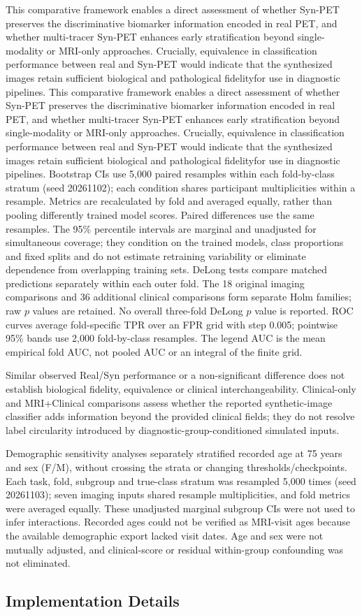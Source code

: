 \documentclass{article}
\providecommand{\DIFaddtex}[1]{{\protect\color{blue} \sf #1}} %
\providecommand{\DIFdeltex}[1]{{\protect\color{red} \ifmmode #1\else\scriptsize #1\fi}} %
\providecommand{\DIFaddbegin}{} %
\providecommand{\DIFaddend}{} %
\providecommand{\DIFdelbegin}{} %
\providecommand{\DIFdelend}{} %
\providecommand{\DIFadd}[1]{\texorpdfstring{\DIFaddtex{#1}}{#1}} %
\providecommand{\DIFdel}[1]{\texorpdfstring{\DIFdeltex{#1}}{}} %
\newcommand{\DIFscaledelfig}{0.5}
\newlength{\DIFdelgraphicswidth} %
\newlength{\DIFdelgraphicsheight} %
\newcommand{\DIFaddincludegraphics}[2][]{{\color{blue}\fbox{\DIFOincludegraphics[#1]{#2}}}} %
\newcommand{\DIFdelincludegraphics}[2][]{%
\sbox{\DIFdelgraphicsbox}{\DIFOincludegraphics[#1]{#2}}%
\settoboxwidth{\DIFdelgraphicswidth}{\DIFdelgraphicsbox} %
\settoboxtotalheight{\DIFdelgraphicsheight}{\DIFdelgraphicsbox} %
\scalebox{\DIFscaledelfig}{%
\parbox[b]{\DIFdelgraphicswidth}{\usebox{\DIFdelgraphicsbox}\\[-\baselineskip] \rule{\DIFdelgraphicswidth}{0em}}\llap{\resizebox{\DIFdelgraphicswidth}{\DIFdelgraphicsheight}{%
\setlength{\unitlength}{\DIFdelgraphicswidth}%
\begin{picture}(1,1)%
\thicklines\linethickness{2pt} %
{\color[rgb]{1,0,0}\put(0,0){\framebox(1,1){}}}%
{\color[rgb]{1,0,0}\put(0,0){\line( 1,1){1}}}%
{\color[rgb]{1,0,0}\put(0,1){\line(1,-1){1}}}%
\end{picture}%
}\hspace*{3pt}}} %
} %
\DeclareRobustCommand{\DIFaddbegin}{\DIFOaddbegin \let\includegraphics\DIFaddincludegraphics} %
\DeclareRobustCommand{\DIFaddend}{\DIFOaddend \let\includegraphics\DIFOincludegraphics} %
\DeclareRobustCommand{\DIFdelbegin}{\DIFOdelbegin \let\includegraphics\DIFdelincludegraphics} %
\DeclareRobustCommand{\DIFdelend}{\DIFOaddend \let\includegraphics\DIFOincludegraphics} %
\begin{document}
\DIFdelbegin \DIFdel{This comparative framework enables a direct assessment of whether Syn-PET preserves the discriminative biomarker information encoded in real PET, and whether multi-tracer Syn-PET enhances early stratification beyond single-modality or MRI-only approaches. Crucially, equivalence in classification performance between real and Syn-PET would indicate that the synthesized images retain sufficient biological and pathological fidelityfor use in diagnostic pipelines.
}\DIFdelend \DIFaddbegin \DIFadd{Bootstrap CIs use 5,000 paired resamples within each fold-by-class stratum (seed 20261102); each condition shares participant multiplicities within a resample. Metrics are recalculated by fold and averaged equally, rather than pooling differently trained model scores. Paired differences use the same resamples. The 95\% percentile intervals are marginal and unadjusted for simultaneous coverage; they condition on the trained models, class proportions and fixed splits and do not estimate retraining variability or eliminate dependence from overlapping training sets. DeLong tests compare matched predictions separately within each outer fold. The 18 original imaging comparisons and 36 additional clinical comparisons form separate Holm families; raw $p$ values are retained. No overall three-fold DeLong $p$ value is reported. ROC curves average fold-specific TPR over an FPR grid with step 0.005; pointwise 95\% bands use 2,000 fold-by-class resamples. The legend AUC is the mean empirical fold AUC, not pooled AUC or an integral of the finite grid.
}

\DIFadd{Similar observed Real/Syn performance or a non-significant difference does not establish biological fidelity, equivalence or clinical interchangeability. Clinical-only and MRI+Clinical comparisons assess whether the reported synthetic-image classifier adds information beyond the provided clinical fields; they do not resolve label circularity introduced by diagnostic-group-conditioned simulated inputs.
}

\DIFadd{Demographic sensitivity analyses separately stratified recorded age at 75 years and sex (F/M), without crossing the strata or changing thresholds/checkpoints. Each task, fold, subgroup and true-class stratum was resampled 5,000 times (seed 20261103); seven imaging inputs shared resample multiplicities, and fold metrics were averaged equally. These unadjusted marginal subgroup CIs were not used to infer interactions. Recorded ages could not be verified as MRI-visit ages because the available demographic export lacked visit dates. Age and sex were not mutually adjusted, and clinical-score or residual within-group confounding was not eliminated.
}\DIFaddend \subsection{Implementation Details}
\end{document}
